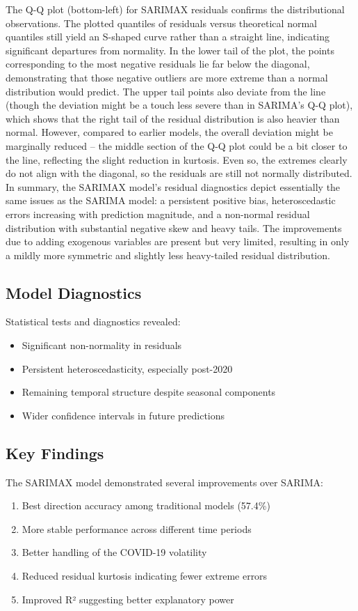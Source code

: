 \documentclass[12pt,a4paper]{report}
\begin{document}
The Q-Q plot (bottom-left) for SARIMAX residuals confirms the distributional observations. The plotted quantiles of residuals versus theoretical normal quantiles still yield an S-shaped curve rather than a straight line, indicating significant departures from normality. In the lower tail of the plot, the points corresponding to the most negative residuals lie far below the diagonal, demonstrating that those negative outliers are more extreme than a normal distribution would predict. The upper tail points also deviate from the line (though the deviation might be a touch less severe than in SARIMA's Q-Q plot), which shows that the right tail of the residual distribution is also heavier than normal. However, compared to earlier models, the overall deviation might be marginally reduced – the middle section of the Q-Q plot could be a bit closer to the line, reflecting the slight reduction in kurtosis. Even so, the extremes clearly do not align with the diagonal, so the residuals are still not normally distributed. In summary, the SARIMAX model's residual diagnostics depict essentially the same issues as the SARIMA model: a persistent positive bias, heteroscedastic errors increasing with prediction magnitude, and a non-normal residual distribution with substantial negative skew and heavy tails. The improvements due to adding exogenous variables are present but very limited, resulting in only a mildly more symmetric and slightly less heavy-tailed residual distribution.

\subsection{Model Diagnostics}
Statistical tests and diagnostics revealed:
\begin{itemize}
    \item Significant non-normality in residuals
    \item Persistent heteroscedasticity, especially post-2020
    \item Remaining temporal structure despite seasonal components
    \item Wider confidence intervals in future predictions
\end{itemize}

\subsection{Key Findings}
The SARIMAX model demonstrated several improvements over SARIMA:
\begin{enumerate}
    \item Best direction accuracy among traditional models (57.4\%)
    \item More stable performance across different time periods
    \item Better handling of the COVID-19 volatility
    \item Reduced residual kurtosis indicating fewer extreme errors
    \item Improved R² suggesting better explanatory power
\end{enumerate}
\end{document}
